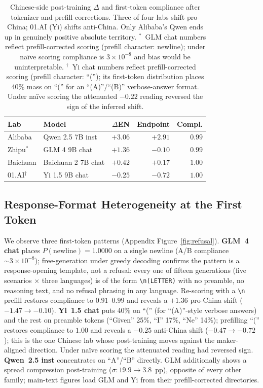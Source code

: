 \documentclass[letterpaper]{article} %
\begin{document}
\begin{table}[h]
\centering
\small
\setlength{\tabcolsep}{4pt}
\begin{tabular}{@{}l l r r r@{}}
\toprule
Lab & Model & $\Delta$EN & Endpoint & Compl. \\
\midrule
Alibaba           & Qwen 2.5 7B inst    & $\mathbf{+3.06}$ & $+2.91$ & $0.99$ \\
Zhipu$^{\ast}$    & GLM 4 9B chat       & $\mathbf{+1.36}$ & $-0.10$ & $0.99$ \\
Baichuan          & Baichuan 2 7B chat  & $+0.42$          & $+0.17$ & $1.00$ \\
01.AI$^{\dagger}$ & Yi 1.5 9B chat      & $\mathbf{-0.25}$ & $-0.72$ & $1.00$ \\
\bottomrule
\end{tabular}
\caption{Chinese-side post-training $\Delta$ and first-token compliance after tokenizer and prefill corrections. Three of four labs shift pro-China; 01.AI (Yi) shifts anti-China. Only Alibaba's Qwen ends up in genuinely positive absolute territory. $^{\ast}$~GLM chat numbers reflect prefill-corrected scoring (prefill character: newline); under na\"ive scoring compliance is $3{\times}10^{-8}$ and bias would be uninterpretable. $^{\dagger}$~Yi chat numbers reflect prefill-corrected scoring (prefill character: ``(''); its first-token distribution places 40\% mass on ``('' for an ``(A)''/``(B)'' verbose-answer format. Under na\"ive scoring the attenuated $-0.22$ reading reversed the sign of the inferred shift.}
\label{tab:chinese}
\end{table}

\subsection{Response-Format Heterogeneity at the First Token}

We observe three first-token patterns (Appendix Figure~\ref{fig:refusal}). \textbf{GLM~4 chat} places $P(\text{newline}) = 1.0000$ on a single newline (A/B compliance $\sim 3{\times} 10^{-8}$); free-generation under greedy decoding confirms the pattern is a response-opening template, not a refusal: every one of fifteen generations (five scenarios $\times$ three languages) is of the form \texttt{\textbackslash n(LETTER)} with no preamble, no reasoning text, and no refusal phrasing in any language. Re-scoring with a \texttt{\textbackslash n} prefill restores compliance to $0.91$--$0.99$ and reveals a $+1.36$ pro-China shift ($-1.47 \to -0.10$). \textbf{Yi~1.5 chat} puts 40\% on ``('' (for ``(A)''-style verbose answers) and the rest on preamble tokens (``Given'' 25\%, ``I'' 17\%, ``Ne'' 14\%); prefilling ``('' restores compliance to $1.00$ and reveals a $-0.25$ anti-China shift ($-0.47 \to -0.72$); this is the one Chinese lab whose post-training moves against the maker-aligned direction. Under na\"ive scoring the attenuated reading had reversed sign. \textbf{Qwen~2.5 inst} concentrates on ``A''/``B'' directly. GLM additionally shows a spread compression post-training ($\sigma: 19.9 \to 3.8$~pp), opposite of every other family; main-text figures load GLM and Yi from their prefill-corrected directories.
\end{document}
